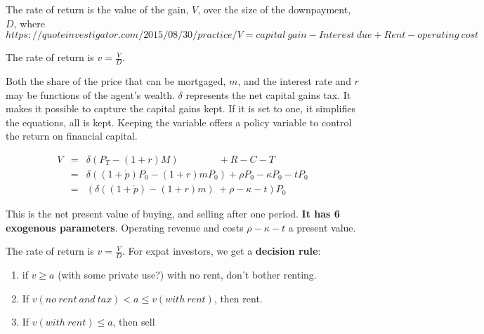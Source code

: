 The rate of return is the value of the gain, $V$,  over the size of the downpayment, $D$, where
\begin{equation}https://quoteinvestigator.com/2015/08/30/practice/
V =capital\ gain - Interest\ due  	+ Rent  - operating\ cost\    
\end{equation}

The rate of return is $v = \frac{V}{D}$. 

Both the  share of the price  that can be mortgaged, $m$, and the interest rate  and $r$ may be functions of the agent's wealth. $\delta$ represents the net capital gains tax. It makes it possible to capture the capital gains kept. If it is set to one, it simplifies the equations, all is kept. Keeping the variable offers a policy variable to control the return on financial capital.

\begin{eqnarray*}
V  %
&=& \delta(P_T- (1+r)M) \qquad \qquad 	 + R  	-C   - T\\
&=& \delta((1+\dot p)  P_0- (1+r)mP_0)   + \rho P_0  	-\kappa P_0 - tP_0\\
&=&( \delta((1+\dot p)  - (1+r)m) \ + \rho   	-\kappa -t) P_0
\end{eqnarray*}

This is the  net present value of buying, and selling after one period. \textbf{It has  6 exogenous parameters}. Operating revenue and costs $ \rho -\kappa - t$ a present value. 

The rate of return is $v = \frac{V}{D}$. For expat investors, we get a \textbf{decision rule}:\begin{enumerate}
\item  if $v \geq a$ (with some private use?) with no rent,  don't bother renting. 
\item If $v(no\ rent\ and\ tax) < a\leq v(with\ rent)$,  then  rent. 
\item If $ v(with\ rent) \le a $,  then sell 
\end{enumerate}


